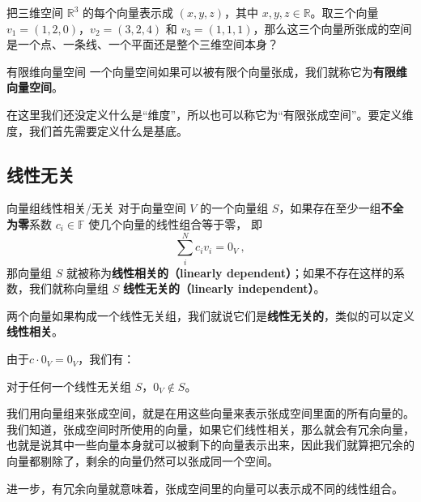 \begin{exercise}{}\label{exe_VecSpn_1}
把三维空间 $\mathbb{R}^3$ 的每个向量表示成 $(x,y,z)$，其中 $x,y,z\in\mathbb{R}$。取三个向量 $v_1 = (1,2,0)$，$v_2 = (3,2,4)$ 和 $v_3 = (1,1,1)$，那么这三个向量所张成的空间是一个点、一条线、一个平面还是整个三维空间本身？

\end{exercise}


\begin{definition}{有限维向量空间}
一个向量空间如果可以被有限个向量张成，我们就称它为\textbf{有限维向量空间}。
\end{definition}

在这里我们还没定义什么是“维度”，所以也可以称它为“有限张成空间”。要定义维度，我们首先需要定义什么是基底。

\subsection{线性无关}


\begin{definition}{向量组线性相关/无关}
对于向量空间 $V$ 的一个向量组 $S$，如果存在至少一组\textbf{不全为零}系数 $c_i \in \mathbb{F}$ 使几个向量的线性组合等于零， 即
\begin{equation}\label{eq_VecSpn_2}
\sum_i^N c_i v_i = 0_V~,
\end{equation}
那向量组 $S$ 就被称为\textbf{线性相关的（linearly dependent）}；如果不存在这样的系数，我们就称向量组 $S$ \textbf{线性无关的（linearly independent）}。

两个向量如果构成一个线性无关组，我们就说它们是\textbf{线性无关的}，类似的可以定义\textbf{线性相关}。
\end{definition}

由于$c \cdot 0_V = 0_V$，我们有：
\begin{theorem}{}
对于任何一个线性无关组 $S$，$0_V \not\in S$。
\end{theorem}

我们用向量组来张成空间，就是在用这些向量来表示张成空间里面的所有向量的。我们知道，张成空间时所使用的向量，如果它们线性相关，那么就会有冗余向量，也就是说其中一些向量本身就可以被剩下的向量表示出来，因此我们就算把冗余的向量都剔除了，剩余的向量仍然可以张成同一个空间。

进一步，有冗余向量就意味着，张成空间里的向量可以表示成不同的线性组合。


